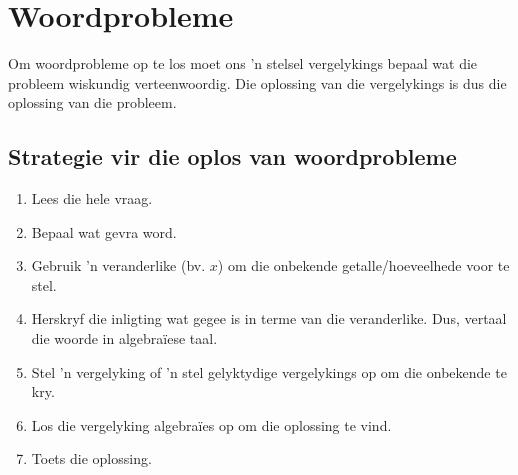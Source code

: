 \section{Woordprobleme}

Om woordprobleme op te los moet ons 'n stelsel vergelykings bepaal wat die probleem wiskundig verteenwoordig. Die oplossing van die vergelykings is dus die oplossing van die probleem.

\subsection*{Strategie vir die oplos van woordprobleme}

\begin{enumerate}[noitemsep, label=\textbf{\arabic*}. ] 
\item Lees die hele vraag.
\item Bepaal wat gevra word.
\item Gebruik ’n veranderlike (bv. $x$) om die onbekende getalle/hoeveelhede voor te stel.
\item  Herskryf die inligting wat gegee is in terme van die veranderlike. Dus, vertaal die woorde in algebraïese
taal.
\item Stel ’n vergelyking of ’n stel gelyktydige vergelykings op om die onbekende te kry.
\item Los die vergelyking algebraïes op om die oplossing te vind.
\item Toets die oplossing.
\end{enumerate}


